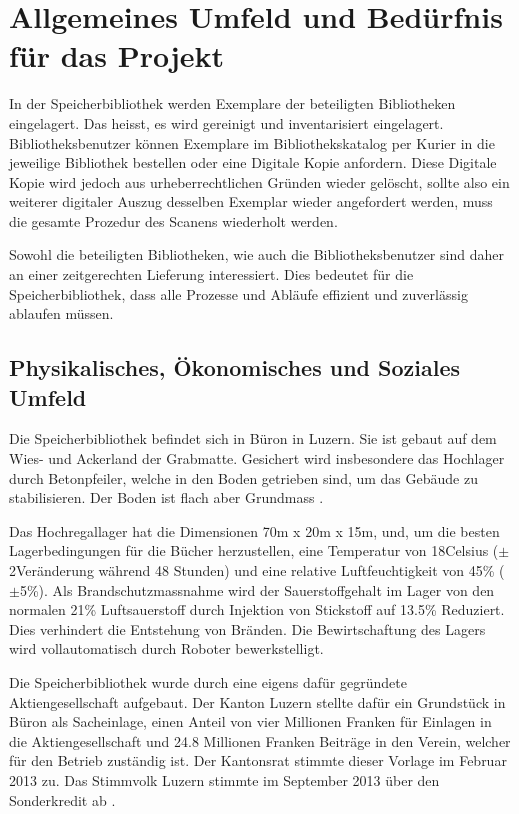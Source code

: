 \chapter{Allgemeines Umfeld und Bedürfnis für das Projekt}
In der Speicherbibliothek werden Exemplare der beteiligten Bibliotheken eingelagert. Das heisst, es wird gereinigt und inventarisiert eingelagert. Bibliotheksbenutzer können Exemplare im Bibliothekskatalog per Kurier in die jeweilige Bibliothek bestellen oder eine Digitale Kopie anfordern. Diese Digitale Kopie wird jedoch aus urheberrechtlichen Gründen wieder gelöscht, sollte also ein weiterer digitaler Auszug desselben Exemplar wieder angefordert werden, muss die gesamte Prozedur des Scanens wiederholt werden.

Sowohl die beteiligten Bibliotheken, wie auch die Bibliotheksbenutzer sind daher an einer zeitgerechten Lieferung interessiert. Dies bedeutet für die Speicherbibliothek, dass alle Prozesse und Abläufe effizient und zuverlässig ablaufen müssen.

\section{Physikalisches, Ökonomisches und Soziales Umfeld}
Die Speicherbibliothek befindet sich in Büron in Luzern. Sie ist gebaut auf dem Wies- und Ackerland der Grabmatte. Gesichert wird insbesondere das Hochlager durch Betonpfeiler, welche in den Boden getrieben sind, um das Gebäude zu stabilisieren. Der Boden ist flach aber Grundmass \parencite{MapGeoAdmin2019}.

Das Hochregallager hat die Dimensionen 70m x 20m x 15m, und, um die besten Lagerbedingungen für die Bücher herzustellen, eine Temperatur von 18\SIUnitSymbolDegree Celsius ($\pm$ 2\SIUnitSymbolDegree Veränderung während 48 Stunden) und eine relative Luftfeuchtigkeit von 45\% ($\pm$5\%). Als Brandschutzmassnahme wird der Sauerstoffgehalt im Lager von den normalen 21\% Luftsauerstoff durch Injektion von Stickstoff auf 13.5\% Reduziert. Dies verhindert die Entstehung von Bränden.
Die Bewirtschaftung des Lagers wird vollautomatisch durch Roboter bewerkstelligt.

Die Speicherbibliothek wurde durch eine eigens dafür gegründete Aktiengesellschaft aufgebaut. Der Kanton Luzern stellte dafür ein Grundstück in Büron als Sacheinlage, einen Anteil von vier Millionen Franken für Einlagen in die Aktiengesellschaft und 24.8 Millionen Franken Beiträge in den Verein, welcher für den Betrieb zuständig ist. Der Kantonsrat stimmte dieser Vorlage im Februar 2013 zu. Das Stimmvolk Luzern stimmte im September 2013 über den Sonderkredit ab  \parencite{KantonLuzern2013}.

